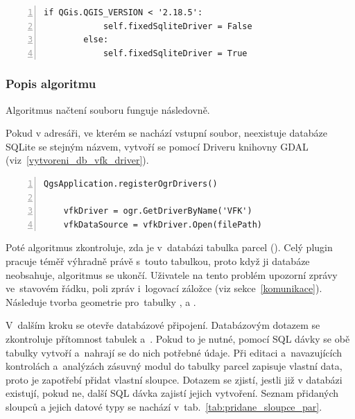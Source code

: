{\scriptsize
\begin{lstlisting}[style=python, caption={Kontrola verze programu QGIS}, captionpos=b, label=kontrola_verze_qgis, backgroundcolor = \color{light-gray},  numbers=left]
        if QGis.QGIS_VERSION < '2.18.5':
            self.fixedSqliteDriver = False
        else:
            self.fixedSqliteDriver = True
\end{lstlisting}}

\subsubsection{Popis algoritmu}
\label{popis_algoritmu_nacteni_vfk}

Algoritmus načtení  souboru funguje následovně.

Pokud v adresáři, ve kterém se nachází vstupní  soubor, neexistuje databáze SQLite se stejným názvem, vytvoří se pomocí  Driveru knihovny GDAL (viz~\ref{vytvoreni_db_vfk_driver}).

{\scriptsize
\begin{lstlisting}[style=python, caption={Vytvoření SQLite databáze pomocí VFK Driveru}, captionpos=b, label=vytvoreni_db_vfk_driver, backgroundcolor = \color{light-gray},  numbers=left]
	QgsApplication.registerOgrDrivers()

	vfkDriver = ogr.GetDriverByName('VFK')
	vfkDataSource = vfkDriver.Open(filePath)
\end{lstlisting}}

Poté algoritmus zkontroluje, zda je v~databázi tabulka parcel (). Celý plugin pracuje téměř výhradně právě s~touto tabulkou, proto když ji databáze neobsahuje, algoritmus se ukončí. Uživatele na tento problém upozorní zprávy ve~stavovém řádku, poli zpráv i~logovací záložce (viz sekce~\ref{komunikace}). Následuje tvorba geometrie pro~tabulky ,  a .

V~dalším kroku se otevře databázové připojení. Databázovým dotazem se zkontroluje přítomnost tabulek \textit{} a~\textit{}. Pokud to je nutné, pomocí SQL dávky se obě tabulky vytvoří a~nahrají se do nich potřebné údaje. Při editaci a~navazujících kontrolách a~analýzách zásuvný modul do tabulky parcel zapisuje vlastní data, proto je zapotřebí přidat vlastní sloupce. Dotazem se zjistí, jestli již v databázi existují, pokud ne, další SQL dávka zajistí jejich vytvoření. Seznam přidaných sloupců a jejich datové typy se nachází v~tab.~\ref{tab:pridane_sloupce_par}.

